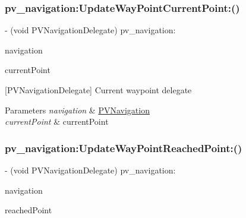 \subsubsection{\texorpdfstring{pv\+\_\+navigation\+:\+Update\+Way\+Point\+Current\+Point\+:()}{pv\_navigation:UpdateWayPointCurrentPoint:()}}
{\footnotesize\ttfamily -\/ (void P\+V\+Navigation\+Delegate) pv\+\_\+navigation\+: \begin{DoxyParamCaption}\item[{(\hyperlink{interface_p_v_navigation}{P\+V\+Navigation} $\ast$)}]{navigation }\item[{UpdateWayPointCurrentPoint:(int)}]{current\+Point }\end{DoxyParamCaption}\hspace{0.3cm}{\ttfamily [optional]}}

\mbox{[}P\+V\+Navigation\+Delegate\mbox{]} Current waypoint delegate


\begin{DoxyParams}{Parameters}
{\em navigation} & \hyperlink{interface_p_v_navigation}{P\+V\+Navigation} \\
\hline
{\em current\+Point} & current\+Point \\
\hline
\end{DoxyParams}
\mbox{\label{protocol_p_v_navigation_delegate_01-p_a683e523acf5f6b15c8915e7b84be7429}} 
\subsubsection{\texorpdfstring{pv\+\_\+navigation\+:\+Update\+Way\+Point\+Reached\+Point\+:()}{pv\_navigation:UpdateWayPointReachedPoint:()}}
{\footnotesize\ttfamily -\/ (void P\+V\+Navigation\+Delegate) pv\+\_\+navigation\+: \begin{DoxyParamCaption}\item[{(\hyperlink{interface_p_v_navigation}{P\+V\+Navigation} $\ast$)}]{navigation }\item[{UpdateWayPointReachedPoint:(int)}]{reached\+Point }\end{DoxyParamCaption}\hspace{0.3cm}{\ttfamily [optional]}}

